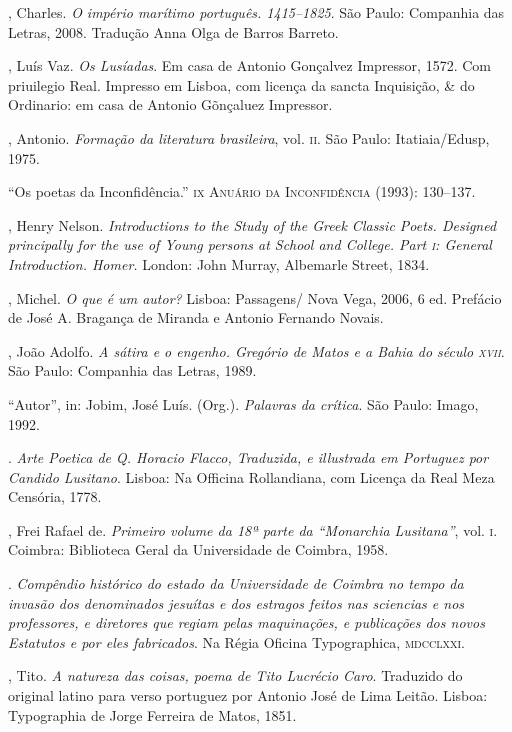 \begin{bibliohedra}
, Charles. \emph{O império marítimo português. 1415--1825}. São
Paulo: Companhia das Letras, 2008. Tradução Anna Olga de
Barros Barreto.

, Luís Vaz. \emph{Os Lusíadas}. Em casa de Antonio Gonçalvez
Impressor, 1572. Com priuilegio Real. Impresso em Lisboa,
com licença da sancta Inquisição, \& do Ordinario: em casa de
Antonio Gõnçaluez Impressor.

, Antonio. \emph{Formação da literatura brasileira}, vol. \textsc{ii}. São
Paulo: Itatiaia/Edusp, 1975.

 “Os poetas da Inconfidência.” \textsc{ix} \textsc{Anuário da Inconfidência} (1993): 130--137.


, Henry Nelson. \emph{Introductions to the Study of the
Greek Classic Poets. Designed principally for the use of Young
persons at School and College. Part \textsc{i}: General Introduction. Homer.} London: John Murray, Albemarle Street, 1834.

, Michel. \emph{O que é um autor?} Lisboa: Passagens/ Nova
Vega, 2006, 6 ed. Prefácio de José A. Bragança de Miranda e
Antonio Fernando Novais.

, João Adolfo. \emph{A sátira e o engenho. Gregório de Matos e
a Bahia do século \textsc{xvii}}. São Paulo: Companhia das Letras, 1989.

 “Autor”, in: Jobim, José Luís. (Org.). \emph{Palavras da
crítica}. São Paulo: Imago, 1992.

. \emph{Arte Poetica de Q. Horacio Flacco, Traduzida, e illustrada em Portuguez por Candido Lusitano}. Lisboa: Na Officina
Rollandiana, com Licença da Real Meza Censória, 1778.

, Frei Rafael de. \emph{Primeiro volume da 18ª parte da “Monarchia Lusitana”}, vol. \textsc{i}. Coimbra: Biblioteca Geral da Universidade de Coimbra, 1958.

. \emph{Compêndio histórico do estado
da Universidade de Coimbra no tempo da invasão dos denominados jesuítas e dos estragos feitos nas sciencias e nos professores, e
diretores que regiam pelas maquinações, e publicações dos novos
Estatutos e por eles fabricados}. Na Régia Oficina Typographica,
\textsc{mdcclxxi}.

, Tito. \emph{A natureza das coisas, poema de Tito Lucrécio
Caro}. Traduzido do original latino para verso portuguez por
Antonio José de Lima Leitão. Lisboa: Typographia de Jorge
Ferreira de Matos, 1851.


\end{bibliohedra}
